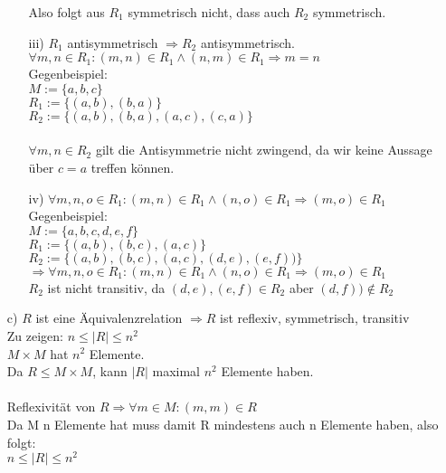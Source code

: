 \documentclass[paper = a4, ngerman]{scrartcl}
\begin{document}
\begin{itemize}
\begin{itemize}
				Also folgt aus 	$R_1 $ symmetrisch nicht, dass auch $R_2$ symmetrisch.
			\item[iii)]
				$R_1$ antisymmetrisch $\Rightarrow R_2$ antisymmetrisch.\\
				$\forall m,n \in R_1 : (m,n) \in R_1 \wedge (n,m) \in R_1 \Rightarrow m = n$\\
				Gegenbeispiel:\\
				$M := \{a,b,c\}$\\
				$R_1 := \{(a,b),(b,a)\}$\\
				$R_2 := \{(a,b),(b,a),(a,c),(c,a)\}$\\\\
				$\forall m,n \in R_2 $ gilt die Antisymmetrie nicht zwingend, da wir keine Aussage über $ c = a $ treffen können.
			\item[iv)]
				$\forall m,n,o \in R_1 : (m,n) \in R_1 \wedge (n,o) \in R_1 \Rightarrow (m,o) \in R_1$\\
				Gegenbeispiel:\\
				$M := \{a,b,c,d,e,f\}$\\
				$R_1 := \{(a,b),(b,c),(a,c)\}$\\
				$R_2 := \{(a,b),(b,c),(a,c),(d,e),(e,f))\}$\\
				$\Rightarrow \forall m,n,o \in R_1 : (m,n) \in R_1 \wedge (n,o) \in R_1 \Rightarrow (m,o) \in R_1$\\
				$R_2$ ist nicht transitiv, da $(d,e), (e,f) \in R_2 $ aber $(d,f)) \notin R_2$\\
		\end{itemize}
	\item[c)]
		$R$ ist eine Äquivalenzrelation $\Rightarrow R$ ist reflexiv, symmetrisch, transitiv\\
		Zu zeigen: $n \le |R| \le n^2$\\
		$M \times M $ hat $n^2$ Elemente.\\ Da $R \le M \times M$, kann $|R|$ maximal $n^2$ Elemente haben.\\\\
		Reflexivität von $R \Rightarrow \forall m \in M : (m,m) \in R$\\
		Da M n Elemente hat muss damit R mindestens auch n Elemente haben, also folgt:\\
		$n \le |R| \le n^2$
\end{itemize}
\end{document}
